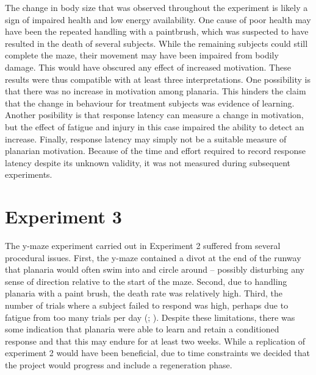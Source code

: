 \documentclass[
  jou,
  floatsintext,
  longtable,
  nolmodern,
  notxfonts,
  notimes,
  donotrepeattitle,
  colorlinks=true,linkcolor=blue,citecolor=blue,urlcolor=blue]{apa7}
\begin{document}
The change in body size that was observed throughout the experiment is
likely a sign of impaired health and low energy availability. One cause
of poor health may have been the repeated handling with a paintbrush,
which was suspected to have resulted in the death of several subjects.
While the remaining subjects could still complete the maze, their
movement may have been impaired from bodily damage. This would have
obscured any effect of increased motivation. These results were thus
compatible with at least three interpretations. One possibility is that
there was no increase in motivation among planaria. This hinders the
claim that the change in behaviour for treatment subjects was evidence
of learning. Another posibility is that response latency can measure a
change in motivation, but the effect of fatigue and injury in this case
impaired the ability to detect an increase. Finally, response latency
may simply not be a suitable measure of planarian motivation. Because of
the time and effort required to record response latency despite its
unknown validity, it was not measured during subsequent experiments.

\section{Experiment 3}\label{sec-experiment-3}

The y-maze experiment carried out in Experiment 2 suffered from several
procedural issues. First, the y-maze contained a divot at the end of the
runway that planaria would often swim into and circle around -- possibly
disturbing any sense of direction relative to the start of the maze.
Second, due to handling planaria with a paint brush, the death rate was
relatively high. Third, the number of trials where a subject failed to
respond was high, perhaps due to fatigue from too many trials per day
(;
). Despite these
limitations, there was some indication that planaria were able to learn
and retain a conditioned response and that this may endure for at least
two weeks. While a replication of experiment 2 would have been
beneficial, due to time constraints we decided that the project would
progress and include a regeneration phase.
\end{document}
